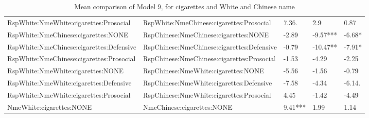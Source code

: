 \documentclass[]{report}
\begin{document}
\begin{table}[ht]
{\begin{tabular}{lllll}
		RspWhite:NmeWhite:cigarettes:Prosocial  &  RspWhite:NmeChinese:cigarettes:Prosocial & 7.36. & 2.9 & 0.87 \\ 
		RspWhite:NmeChinese:cigarettes:NONE  &  RspChinese:NmeChinese:cigarettes:NONE & -2.89 & -9.57*** & -6.68* \\ 
		RspWhite:NmeChinese:cigarettes:Defensive  &  RspChinese:NmeChinese:cigarettes:Defensive & -0.79 & -10.47** & -7.91* \\ 
		RspWhite:NmeChinese:cigarettes:Prosocial  &  RspChinese:NmeChinese:cigarettes:Prosocial & -1.53 & -4.29 & -2.25 \\ 
		RspWhite:NmeWhite:cigarettes:NONE  &  RspChinese:NmeWhite:cigarettes:NONE & -5.56 & -1.56 & -0.79 \\ 
		RspWhite:NmeWhite:cigarettes:Defensive  &  RspChinese:NmeWhite:cigarettes:Defensive & -7.58 & -4.34 & -6.14. \\ 
		RspWhite:NmeWhite:cigarettes:Prosocial  &  RspChinese:NmeWhite:cigarettes:Prosocial & 4.45 & -1.42 & -4.49 \\ 
		NmeWhite:cigarettes:NONE  &  NmeChinese:cigarettes:NONE & 9.41*** & 1.99 & 1.14 \\ 
		\hline
	\end{tabular}}
	\caption{Mean comparison of Model 9, for cigarettes and White and Chinese name} 
\end{table}
\end{document}
